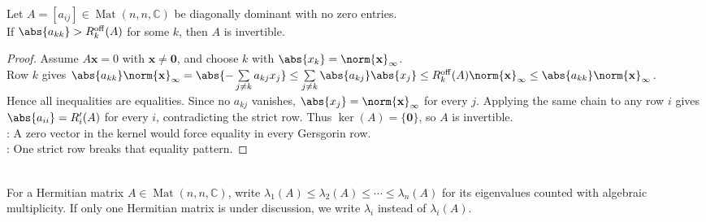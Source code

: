 \begin{theorem} \label{thm:weak-diagonal-dominance-invertible-with-one-strict-row} \\
Let $A=[a_{ij}]\in\operatorname{Mat}(n,n,\mathbb{C})$ be diagonally dominant with no zero entries.\\
If $\abs{a_{kk}}>R_k^{\mathrm{off}}(A)$ for some $k$, then $A$ is invertible.
\begin{proof}
Assume $A\mathbf{x}=0$ with $\mathbf{x}\neq\mathbf{0}$, and choose $k$ with $\abs{x_k}=\norm{\mathbf{x}}_{\infty}$.\\
Row $k$ gives $\abs{a_{kk}}\norm{\mathbf{x}}_{\infty} =\abs{-\sum\limits_{j\neq k}a_{kj}x_j} \leq\sum\limits_{j\neq k}\abs{a_{kj}}\abs{x_j} \leq R_k^{\mathrm{off}}(A)\norm{\mathbf{x}}_{\infty} \leq \abs{a_{kk}}\norm{\mathbf{x}}_{\infty}$.\\
Hence all inequalities are equalities. Since no $a_{kj}$ vanishes, $\abs{x_j}=\norm{\mathbf{x}}_{\infty}$ for every $j$. Applying the same chain to any row $i$ gives $\abs{a_{ii}}=R'_i(A)$ for every $i$, contradicting the strict row. Thus $\ker(A)=\{\mathbf{0}\}$, so $A$ is invertible.\\
: A zero vector in the kernel would force equality in every Gersgorin row.\\
: One strict row breaks that equality pattern.
\end{proof}
\end{theorem}

\begin{definition} \label{def:increasing-hermitian-eigenvalue-ordering} \\
For a Hermitian matrix $A\in\operatorname{Mat}(n,n,\mathbb{C})$, write $\lambda_1(A)\leq\lambda_2(A)\leq\cdots\leq\lambda_n(A)$ for its eigenvalues counted with algebraic multiplicity. If only one Hermitian matrix is under discussion, we write $\lambda_i$ instead of $\lambda_i(A)$.
\end{definition}

